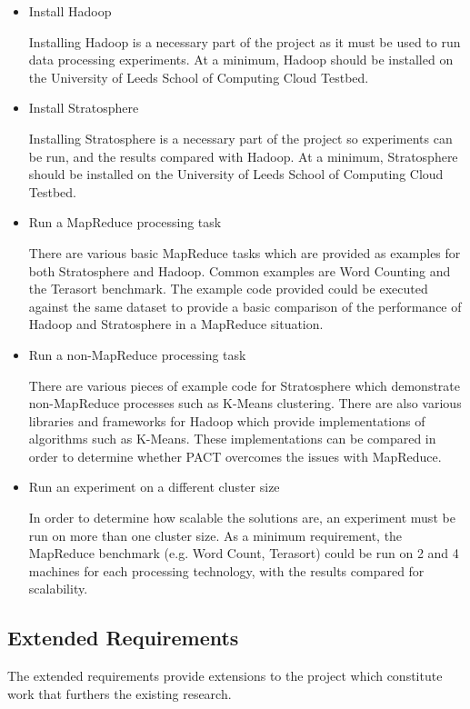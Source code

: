 \begin{itemize}
	\item Install Hadoop

	Installing Hadoop is a necessary part of the project as it must be used to run data processing experiments. At a minimum, Hadoop should be installed on the University of Leeds School of Computing Cloud Testbed. 

	\item Install Stratosphere

	Installing Stratosphere is a necessary part of the project so experiments can be run, and the results compared with Hadoop. At a minimum, Stratosphere should be installed on the University of Leeds School of Computing Cloud Testbed. 
	
	\item Run a MapReduce processing task

	There are various basic MapReduce tasks which are provided as examples for both Stratosphere and Hadoop. Common examples are Word Counting and the Terasort benchmark. The example code provided could be executed against the same dataset to provide a basic comparison of the performance of Hadoop and Stratosphere in a MapReduce situation.

	\item Run a non-MapReduce processing task

	There are various pieces of example code for Stratosphere which demonstrate non-MapReduce processes such as K-Means clustering. There are also various libraries and frameworks for Hadoop which provide implementations of algorithms such as K-Means. These implementations can be compared in order to determine whether PACT overcomes the issues with MapReduce.

	\item Run an experiment on a different cluster size

	In order to determine how scalable the solutions are, an experiment must be run on more than one cluster size. As a minimum requirement, the MapReduce benchmark (e.g. Word Count, Terasort) could be run on 2 and 4 machines for each processing technology, with the results compared for scalability.
\end{itemize}

\subsection{Extended Requirements}
The extended requirements provide extensions to the project which constitute work that furthers the existing research.

